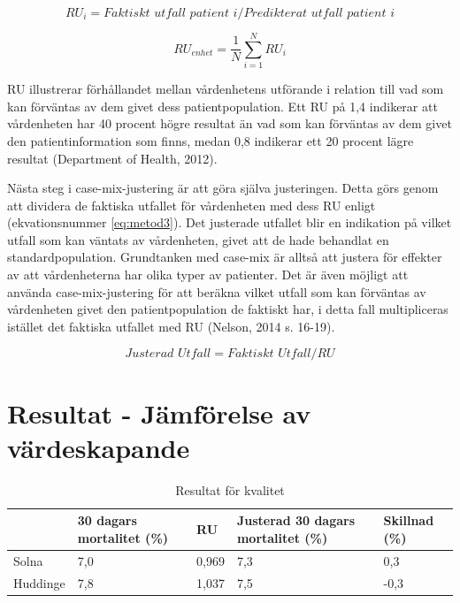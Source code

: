 \begin{equation}
\label{eq:metod1}
	RU_i = Faktiskt \,\,  utfall \,\, patient \,\, i/Predikterat \,\, utfall \,\, patient \,\, i
\end{equation}

\begin{equation}
\label{eq:metod2}
	RU_{enhet} = \frac{1}{N} \sum_{i=1}^{N} RU_i
\end{equation}


RU illustrerar förhållandet mellan vårdenhetens utförande i relation till vad som kan förväntas av dem givet dess patientpopulation. Ett RU på 1,4 indikerar att vårdenheten har 40 procent högre resultat än vad som kan förväntas av dem givet den patientinformation som finns, medan 0,8 indikerar ett 20 procent lägre resultat (Department of Health, 2012).

Nästa steg i case-mix-justering är att göra själva justeringen. Detta görs genom att dividera de faktiska utfallet för vårdenheten med dess RU enligt (ekvationsnummer \ref{eq:metod3}). Det justerade utfallet blir en indikation på vilket utfall som kan väntats av vårdenheten, givet att de hade behandlat en standardpopulation. Grundtanken med case-mix är alltså att justera för effekter av att vårdenheterna har olika typer av patienter. Det är även möjligt att använda case-mix-justering för att beräkna vilket utfall som kan förväntas av vårdenheten givet den patientpopulation de faktiskt har, i detta fall multipliceras istället det faktiska utfallet med RU (Nelson, 2014 s. 16-19).

\begin{equation}
\label{eq:metod3}
	Justerad \,\, Utfall = Faktiskt \,\, Utfall/RU
\end{equation}


\section{Resultat - Jämförelse av värdeskapande}

\begin{table}[h]
\centering
\caption{Resultat för kvalitet}
\label{tab:kvalres}
\begin{tabular}{|p{2cm}|p{3cm}|p{1cm}|p{4cm}|p{2cm}|}
\hline
         & 30 dagars mortalitet (\%) & RU    & Justerad 30 dagars mortalitet (\%) & Skillnad (\%) \\ \hline
Solna    & 7,0                      & 0,969 & 7,3                               & 0,3          \\ \hline
Huddinge & 7,8                      & 1,037 & 7,5                               & -0,3         \\ \hline
\end{tabular}
\end{table}


